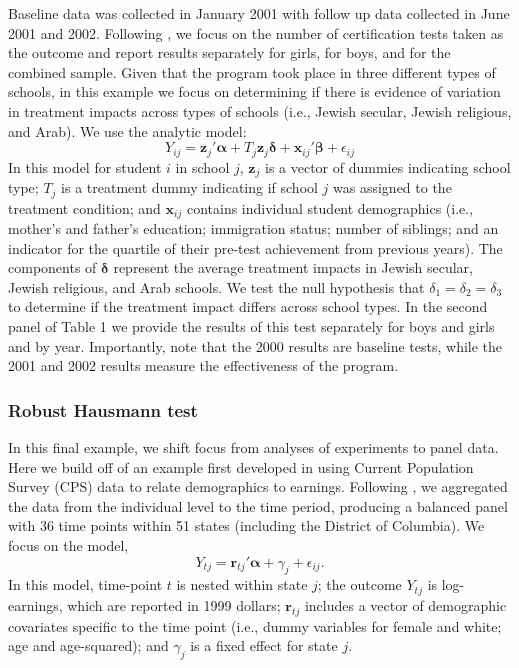 \documentclass[12pt]{article}\usepackage[]{graphicx}\usepackage[]{color}
\newcommand{\bm}{\mathbf}
\newcommand{\bs}{\boldsymbol}
\begin{document}
Baseline data was collected in January 2001 with follow up data collected in June 2001 and 2002. Following \citet{Angrist2009effects}, we focus on the number of certification tests taken as the outcome and report results separately for girls, for boys, and for the combined sample. Given that the program took place in three different types of schools, in this example we focus on determining if there is evidence of variation in treatment impacts across types of schools (i.e., Jewish secular, Jewish religious, and Arab). We use the analytic model:
\begin{equation}
Y_{ij} = \bm{z}_j'\bs\alpha + T_j \bm{z}_j \bs\delta + \bm{x}_{ij}'\bs\beta + \epsilon_{ij}
\end{equation}
In this model for student $i$ in school $j$, $\bm{z}_j$ is a vector of dummies indicating school type; $T_j$ is a treatment dummy indicating if school $j$ was assigned to the treatment condition; and $\bm{x}_{ij}$ contains individual student demographics (i.e., mother’s and father’s education; immigration status; number of siblings; and an indicator for the quartile of their pre-test achievement from previous years). The components of $\bs\delta$ represent the average treatment impacts in Jewish secular, Jewish religious, and Arab schools. We test the null hypothesis that $\delta_1 = \delta_2 = \delta_3$ to determine if the treatment impact differs across school types. In the second panel of Table 1 we provide the results of this test separately for boys and girls and by year. Importantly, note that the 2000 results are baseline tests, while the 2001 and 2002 results measure the effectiveness of the program. 

\subsubsection{Robust Hausmann test} 

In this final example, we shift focus from analyses of experiments to panel data. Here we build off of an example first developed in \citet{Bertrand2004how} using Current Population Survey (CPS) data to relate demographics to earnings. Following \citet{Cameron2015practitioners}, we aggregated the data from the individual level to the time period, producing a balanced panel with 36 time points within 51 states (including the District of Columbia). We focus on the model,
\begin{equation}
Y_{tj} = \bm{r}_{tj}'\bs\alpha + \gamma_j + \epsilon_{ij}.
\end{equation}
In this model, time-point $t$ is nested within state $j$; the outcome $Y_{tj}$ is log-earnings, which are reported in 1999 dollars; $\bm{r}_{tj}$ includes a vector of demographic covariates specific to the time point (i.e., dummy variables for female and white; age and age-squared); and $\gamma_j$ is a fixed effect for state $j$. 
\end{document}

